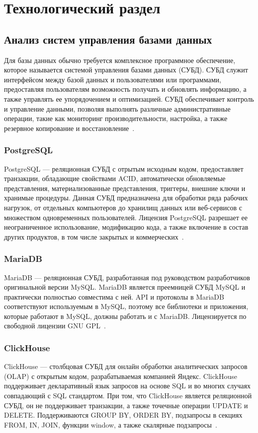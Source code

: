 \chapter{Технологический раздел}

\section{Анализ систем управления базами данных}
Для базы данных обычно требуется комплексное программное обеспечение, которое называется системой управления базами данных (СУБД). СУБД служит интерфейсом между базой данных и пользователями или программами, предоставляя пользователям возможность получать и обновлять информацию, а также управлять ее упорядочением и оптимизацией. СУБД обеспечивает контроль и управление данными, позволяя выполнять различные административные операции, такие как мониторинг производительности, настройка, а также резервное копирование и восстановление~\cite{db}.

\subsection{PostgreSQL}
PostgreSQL --- реляционная СУБД с отрытым исходным кодом, предоставляет транзакции, обладающие свойствами ACID, автоматически обновляемые представления, материализованные представления, триггеры, внешние ключи и хранимые процедуры. Данная СУБД предназначена для обработки ряда рабочих нагрузок, от отдельных компьютеров до хранилищ данных или веб-сервисов с множеством одновременных пользователей. Лицензия PostgreSQL разрешает ее неограниченное использование, модификацию кода, а также включение в состав других продуктов, в том числе закрытых и коммерческих~\cite{postgresql}.

\subsection{MariaDB}
MariaDB --- реляционная СУБД, разработанная под руководством разработчиков оригинальной версии MySQL. MariaDB является преемницей СУБД MySQL и практически полностью совместима с ней. API и протоколы в MariaDB соответствуют используемым в MySQL, поэтому все библиотеки и приложения, которые работают в MySQL, должны работать и с MariaDB. Лицензируется по свободной лицензии GNU GPL~\cite{mariadb}.

\subsection{ClickHouse}
ClickHouse --- столбцовая СУБД для онлайн обработки аналитических запросов (OLAP) с открытым кодом, разрабатываемая компанией Яндекс. ClickHouse поддерживает декларативный язык запросов на основе SQL и во многих случаях совпадающий с SQL стандартом. При том, что ClickHouse является реляционной СУБД, он не поддерживает транзакции, а также точечные операции UPDATE и DELETE. Поддерживаются GROUP BY, ORDER BY, подзапросы в секциях FROM, IN, JOIN, функции window, а также скалярные подзапросы~\cite{clickhouse}.

